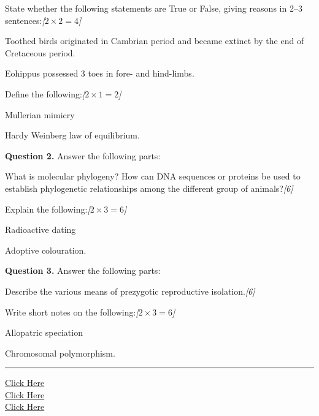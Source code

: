 \documentclass[11pt,a4paper]{article}
\newcommand{\pts}[1]{\hfill   \textit{[#1]}}
\begin{document}
\begin{parts}
  \item State whether the following statements are True or False, giving reasons in 2--3 sentences:\pts{$2  \times 2 = 4$}
  
\begin{parts}
    \item Toothed birds originated in Cambrian period and became extinct by the end of Cretaceous period.
    \item Eohippus possessed 3 toes in fore- and hind-limbs.
  \end{parts}

  \item Define the following:\pts{$2  \times 1 = 2$}
  
\begin{parts}
    \item Mullerian mimicry
    \item Hardy Weinberg law of equilibrium.
  \end{parts}
\end{parts}

\medskip


\noindent   \textbf{Question 2.} Answer the following parts:

\begin{parts}
  \item What is molecular phylogeny? How can DNA sequences or proteins be used to establish phylogenetic relationships among the different group of animals?\pts{6}
  \item Explain the following:\pts{$2  \times 3 = 6$}
  
\begin{parts}
    \item Radioactive dating
    \item Adoptive colouration.
  \end{parts}
\end{parts}

\medskip


\noindent   \textbf{Question 3.} Answer the following parts:

\begin{parts}
  \item Describe the various means of prezygotic reproductive isolation.\pts{6}
  \item Write short notes on the following:\pts{$2  \times 3 = 6$}
  
\begin{parts}
    \item Allopatric speciation
    \item Chromosomal polymorphism.
  \end{parts}
\end{parts}

\vfill
\rule{\linewidth}{0.4pt}

\begin{center}\small
\href{https://bhu-exam.vercel.app/}{Click Here}\\[4pt]\href{https://me-aryan.vercel.app/}{Click Here}\\[4pt]\href{https://quashan-me.vercel.app/}{Click Here}
\end{center}
\end{document}
